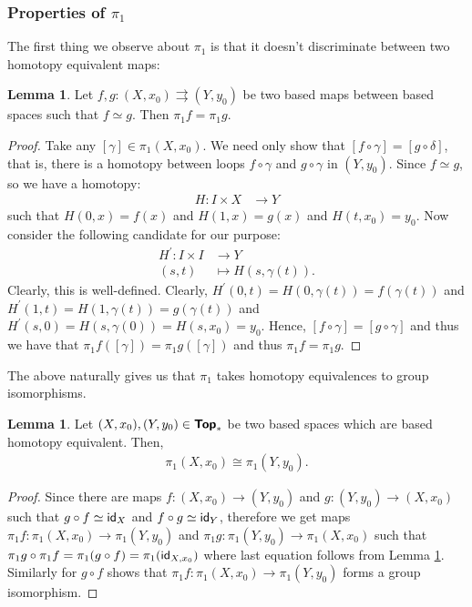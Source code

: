 \documentclass[letterpaper,11pt,twoside]{article}
\theoremstyle{definition}
\theoremstyle{definition}
\theoremstyle{definition}
\theoremstyle{definition}
\newtheorem{lemma}[proposition]{\textbf{Lemma}}
\theoremstyle{definition}
\theoremstyle{definition}
\theoremstyle{remark}
\theoremstyle{definition}
\newcommand{\cat}[1]{{\fontfamily{lmss}\selectfont 
		\text{\textbf{#1}}
}}
\newcommand{\isom}{\cong}
\newcommand{\id}[1]{{\fontfamily{lmss}\selectfont 
		\text{id}_{#1}
}}
\begin{document}
\subsubsection{Properties of $\pi_1$}
The first thing we observe about $\pi_1$ is that it
doesn't discriminate between two homotopy equivalent maps:
\begin{lemma}\label{L-4.2.1}
Let $f,g : (X,x_0)\rightrightarrows (Y,y_0)$ be two based maps between based spaces such that $f\simeq g$. Then $\pi_1f = \pi_1g$.
\end{lemma}
\begin{proof}
    Take any $[\gamma] \in \pi_1(X,x_0)$. We need only show that $[f\circ \gamma] = [g\circ \delta]$, that is, there is a homotopy between loops $f\circ \gamma$ and $g\circ \gamma$ in $(Y,y_0)$. Since $f\simeq g$, so we have a homotopy:
    \begin{align*}
        H : I\times X &\longrightarrow Y
    \end{align*}
    such that $H(0,x) = f(x)$ and $H(1,x) = g(x)$ and $H(t,x_0) = y_0$. Now consider the following candidate for our purpose:
    \begin{align*}
        H^\prime: I\times I &\longrightarrow Y\\
        (s,t) &\longmapsto H(s,\gamma(t)).
    \end{align*}
    Clearly, this is well-defined. Clearly, $H^\prime(0,t) = H(0,\gamma(t)) = f(\gamma(t)) $ and $H^\prime(1,t) = H(1,\gamma(t)) = g(\gamma (t))$ and $H^\prime(s,0) = H(s,\gamma(0)) = H(s,x_0) = y_0$. Hence, $[f\circ \gamma] = [g\circ \gamma]$ and thus we have that $\pi_1f([\gamma]) = \pi_1g([\gamma])$ and thus $\pi_1f = \pi_1g$.
\end{proof}
The above naturally gives us that $\pi_1$ takes homotopy equivalences to group isomorphisms.
\begin{lemma}\label{L-4.2.2}
Let $(X,x_0), (Y,y_0)\in \cat{Top}_*$ be two based spaces which are based homotopy equivalent. Then,
\begin{align*}
    \pi_1(X,x_0) \isom \pi_1(Y,y_0).
\end{align*}
\end{lemma}
\begin{proof}
    Since there are maps $f : (X,x_0) \to (Y,y_0)$ and $g : (Y,y_0) \to (X,x_0)$ such that $g\circ f \simeq \id{X}$ and $f\circ g \simeq \id{Y}$, therefore we get maps $\pi_1 f : \pi_1(X,x_0) \to \pi_1(Y,y_0)$ and $\pi_1g : \pi_1(Y,y_0) \to \pi_1(X,x_0)$ such that $\pi_1g \circ \pi_1f = \pi_1(g\circ f) = \pi_1(\id{X,x_0})$ where last equation follows from Lemma \ref{L-4.2.1}. Similarly for $g\circ f$ shows that $\pi_1 f : \pi_1(X,x_0) \to \pi_1(Y,y_0)$ forms a group isomorphism.
\end{proof}
\end{document}
